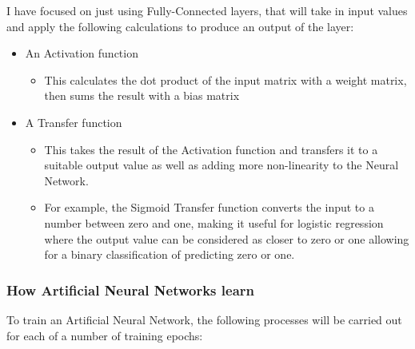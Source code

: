 \documentclass[./project-report/src/latex/project-report.tex]{subfiles}
\begin{document}
I have focused on just using Fully-Connected layers, that will take in input values and apply the following calculations to produce an output of the layer:

\begin{itemize}
    \item An Activation function
    \begin{itemize}
        \item This calculates the dot product of the input matrix with a weight matrix, then sums the result with a bias matrix
    \end{itemize}
    \item A Transfer function
    \begin{itemize}
        \item This takes the result of the Activation function and transfers it to a suitable output value as well as adding more non-linearity to the Neural Network.
        \item For example, the Sigmoid Transfer function converts the input to a number between zero and one, making it useful for logistic regression where the output 
              value can be considered as closer to zero or one allowing for a binary classification of predicting zero or one.
    \end{itemize}
\end{itemize}
\vspace{5mm}

\subsubsection{How Artificial Neural Networks learn}
\vspace{5mm}

To train an Artificial Neural Network, the following processes will be carried out for each of a number of training epochs:
\end{document}
